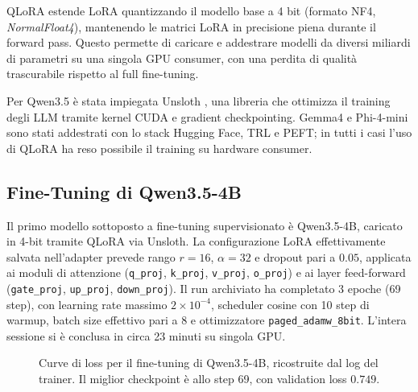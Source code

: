 \documentclass[final,5p,times,twocolumn]{elsarticle}
\begin{document}
QLoRA \citep{dettmers2023qlora} estende LoRA quantizzando il modello base a 4 bit (formato NF4, \textit{NormalFloat4}), mantenendo le matrici LoRA in precisione piena durante il forward pass. Questo permette di caricare e addestrare modelli da diversi miliardi di parametri su una singola GPU consumer, con una perdita di qualità trascurabile rispetto al full fine-tuning.

Per Qwen3.5 è stata impiegata Unsloth \citep{unsloth}, una libreria che ottimizza il training degli LLM tramite kernel CUDA e gradient checkpointing. Gemma4 e Phi-4-mini sono stati addestrati con lo stack Hugging Face, TRL e PEFT; in tutti i casi l'uso di QLoRA ha reso possibile il training su hardware consumer.

\subsection{Fine-Tuning di Qwen3.5-4B}

Il primo modello sottoposto a fine-tuning supervisionato è Qwen3.5-4B, caricato in 4-bit tramite QLoRA via Unsloth. La configurazione LoRA effettivamente salvata nell'adapter prevede rango $r=16$, $\alpha=32$ e dropout pari a $0.05$, applicata ai moduli di attenzione (\texttt{q\_proj}, \texttt{k\_proj}, \texttt{v\_proj}, \texttt{o\_proj}) e ai layer feed-forward (\texttt{gate\_proj}, \texttt{up\_proj}, \texttt{down\_proj}). Il run archiviato ha completato 3 epoche (69 step), con learning rate massimo $2 \times 10^{-4}$, scheduler cosine con 10 step di warmup, batch size effettivo pari a 8 e ottimizzatore \texttt{paged\_adamw\_8bit}. L'intera sessione si è conclusa in circa 23 minuti su singola GPU.

\begin{figure}[t]
  \centering
  \caption{Curve di loss per il fine-tuning di Qwen3.5-4B, ricostruite dal log del trainer. Il miglior checkpoint è allo step 69, con validation loss $0.749$.}
  \label{fig:qwen35_loss}
\end{figure}
\end{document}
